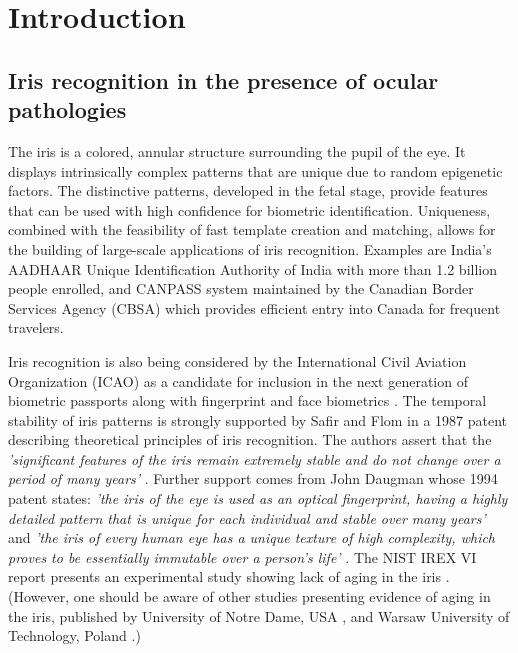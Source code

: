 \documentclass[article,12pt]{elsarticle}
\begin{document}
\section{Introduction}
\label{introduction}

\subsection{Iris recognition in the presence of ocular pathologies} 

The iris is a colored, annular structure surrounding the pupil of the eye. It displays intrinsically complex patterns that are unique due to random epigenetic factors. The distinctive patterns, developed in the fetal stage, provide features that can be used with high confidence for biometric identification. Uniqueness, combined with the feasibility of fast template creation and matching, allows for the building of large-scale applications of iris recognition. Examples are India’s AADHAAR Unique Identification Authority of India \cite{AADHAAR} with more than 1.2 billion people enrolled, and CANPASS system \cite{CBSA} maintained by the Canadian Border Services Agency (CBSA) which provides efficient entry into Canada for frequent travelers. 

Iris recognition is also being considered by the International Civil Aviation Organization (ICAO) as a candidate for inclusion in the next generation of biometric passports along with fingerprint and face biometrics \cite{ICAO}. The temporal stability of iris patterns is strongly supported by Safir and Flom in a 1987 patent describing theoretical principles of iris recognition. The authors assert that the \emph{'significant features of the iris remain extremely stable and do not change over a period of many years'} \cite{SafirFlom}. Further support comes from John Daugman whose 1994 patent states: \emph{'the iris of the eye is used as an optical fingerprint, having a highly detailed pattern that is unique for each individual and stable over many years'} and \emph{'the iris of every human eye has a unique texture of high complexity, which proves to be essentially immutable over a person’s life'} \cite{DaugmanPatent}. The NIST IREX VI report presents an experimental study showing lack of aging in the iris \cite{IREX6}. (However, one should be aware of other studies presenting evidence of aging in the iris, published by University of Notre Dame, USA \cite{Fenker2011,Fenker2012,Baker2013}, and Warsaw University of Technology, Poland \cite{Czajka2014,TrokielewiczAgingIWBF2015}.) 
\end{document}
